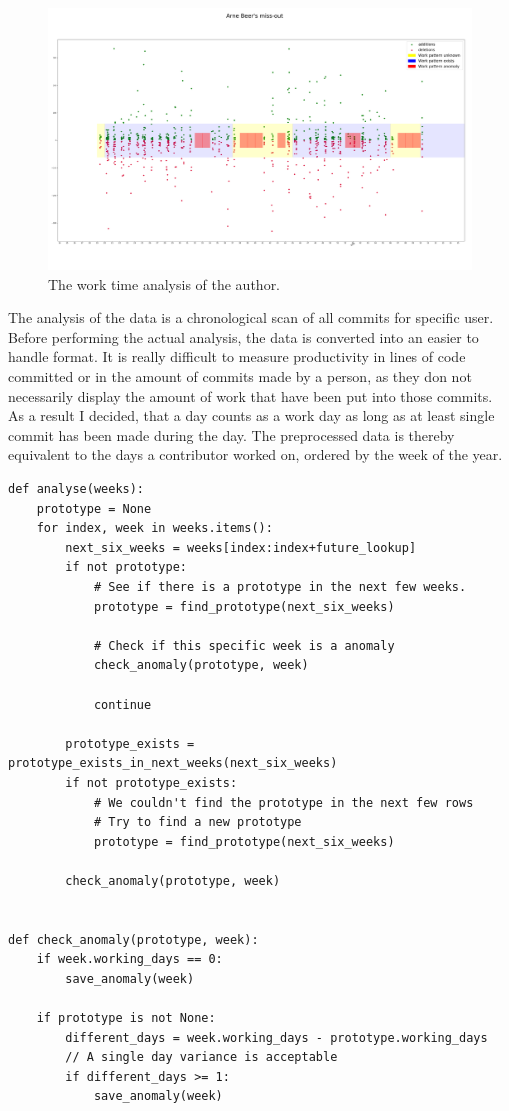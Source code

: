 \begin{figure}[H]
    \includegraphics[scale=0.20]{./graphs/analysis/work-time-analysis}
    \centering
    \caption{The work time analysis of the author.}\label{fig:missing-time}
\end{figure}

The analysis of the data is a chronological scan of all commits for specific user.
Before performing the actual analysis, the data is converted into an easier to handle format.
It is really difficult to measure productivity in lines of code committed or in the amount of commits made by a person, as they don not necessarily display the amount of work that have been put into those commits.
As a result I decided, that a day counts as a work day as long as at least single commit has been made during the day.
The preprocessed data is thereby equivalent to the days a contributor worked on, ordered by the week of the year.

\begin{verbatim}
def analyse(weeks):
    prototype = None
    for index, week in weeks.items():
        next_six_weeks = weeks[index:index+future_lookup]
        if not prototype:
            # See if there is a prototype in the next few weeks.
            prototype = find_prototype(next_six_weeks)

            # Check if this specific week is a anomaly
            check_anomaly(prototype, week)

            continue

        prototype_exists = prototype_exists_in_next_weeks(next_six_weeks)
        if not prototype_exists:
            # We couldn't find the prototype in the next few rows
            # Try to find a new prototype
            prototype = find_prototype(next_six_weeks)

        check_anomaly(prototype, week)


def check_anomaly(prototype, week):
    if week.working_days == 0:
        save_anomaly(week)

    if prototype is not None:
        different_days = week.working_days - prototype.working_days
        // A single day variance is acceptable
        if different_days >= 1:
            save_anomaly(week)

\end{verbatim}
\begingroup
{}\label{lst:miss-out-algorithm}
\endgroup

